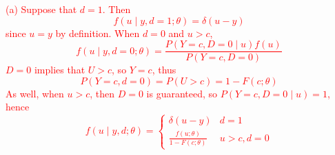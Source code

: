\documentclass[12pt]{article}
\newcommand{\1}{\mathds 1}
\begin{document}
\begin{enumerate}
\noindent \textcolor{red}{
(a) Suppose that $d = 1$. Then 
\begin{equation*}
	f(u \mid y, d = 1 ; \theta) = \delta(u-y)
\end{equation*}
since $u = y$ by definition. When $d = 0$ and $u > c$, 
\begin{equation*}
	f(u \mid y, d = 0 ; \theta) = \frac{P(Y = c, D = 0 \mid u)f(u)}{P(Y = c, D = 0)}
\end{equation*}
$D = 0$ implies that $U > c$, so $Y = c$, thus 
\begin{equation*}
	P(Y = c, d = 0) = P(U > c) = 1 - F(c ; \theta)
\end{equation*}
As well, when $u > c$, then $D = 0$ is guaranteed, so $P(Y = c, D = 0 \mid u) = 1$, 
hence 
\begin{equation*}
	f(u \mid y, d ; \theta) = \begin{cases}
		\delta(u - y) & d = 1\\
		\frac{f(u ; \theta)}{1 - F(c ; \theta)} & u > c , d = 0
	\end{cases}
\end{equation*}
}


\end{enumerate}
\end{document}
